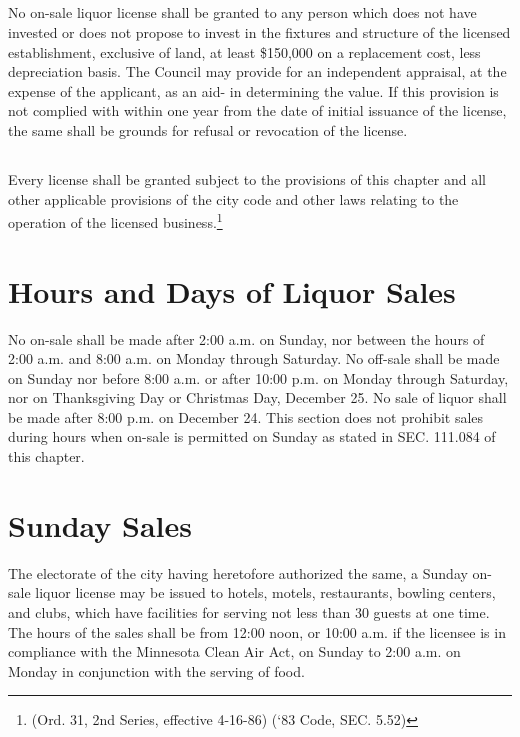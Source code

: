\subsection{}
No on-sale liquor license shall be granted to any person which does not have invested or does not propose to invest in the fixtures and structure of the licensed establishment, exclusive of land, at least \$150,000 on a replacement cost, less depreciation basis.  The Council may provide for an independent appraisal, at the expense of the applicant, as an aid- in determining the value.  If this provision is not complied with within one year from the date of initial issuance of the license, the same shall be grounds for refusal or revocation of the license.
\subsection{}
Every license shall be granted subject to the provisions of this chapter and all other applicable provisions of the city code and other laws relating to the operation of the licensed business.\footnote{(Ord. 31, 2nd Series, effective 4-16-86) (‘83 Code, SEC. 5.52)}

\section{Hours and Days of Liquor Sales}
No on-sale shall be made after 2:00 a.m. on Sunday, nor between the hours of 2:00 a.m. and 8:00 a.m. on Monday through Saturday. No off-sale shall be made on Sunday nor before 8:00 a.m. or after 10:00 p.m. on Monday through Saturday, nor on Thanksgiving Day or Christmas Day, December 25.  No sale of liquor shall be made after 8:00 p.m. on December 24. This section does not prohibit sales during hours when on-sale is permitted on Sunday as stated in SEC. 111.084 of this chapter.

\section{Sunday Sales}
The electorate of the city having heretofore authorized the same, a Sunday on-sale liquor license may be issued to hotels, motels, restaurants, bowling centers, and clubs, which have facilities for serving not less than 30 guests at one time.  The hours of the sales shall be from 12:00 noon, or 10:00 a.m. if the licensee is in compliance with the Minnesota Clean Air Act, on Sunday to 2:00 a.m. on Monday in conjunction with the serving of food.

